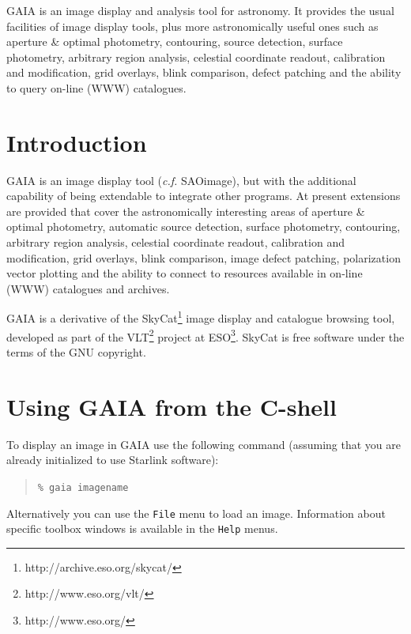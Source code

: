 \documentclass[twoside,11pt]{article}
\newcommand{\stardocinitials}  {SUN}
\newcommand{\stardocnumber}    {214.9}
\newcommand{\stardocabstract} {GAIA is an image display and analysis
tool for astronomy. It provides the usual facilities of image display
tools, plus more astronomically useful ones such as aperture \& optimal
photometry, contouring, source detection, surface photometry,
arbitrary region analysis, celestial coordinate readout, calibration
and modification, grid overlays, blink comparison, defect patching and
the ability to query on-line (WWW) catalogues.}
\newcommand{\stardocname}{\stardocinitials /\stardocnumber}
\newcommand{\htmladdnormallinkfoot}[2]{#1\footnote{#2}}
\newenvironment{latexonly}{}{}
\newcommand{\xref}[3]{#1}
\newcommand{\xlabel}[1]{}
\renewcommand{\_}{\texttt{\symbol{95}}}
\newcommand{\mytt}[1]{{\texttt{#1}}}
\renewcommand{\thepage}{\roman{page}}
\begin{document}
\stardocabstract
  \newpage
  \begin{latexonly}
    \setlength{\parskip}{0mm}
    \tableofcontents
    \setlength{\parskip}{\medskipamount}
    \markboth{\stardocname}{\stardocname}
  \end{latexonly}
\cleardoublepage
\renewcommand{\thepage}{\arabic{page}}
\setcounter{page}{1}


\section{Introduction\xlabel{introduction}\label{introduction}}

GAIA is an image display tool (\textit{c.f.} \xref{SAOimage}{sun166}{}), 
but with the additional capability of being extendable to integrate
other programs.  At present extensions are provided that cover the
astronomically interesting areas of aperture \& optimal photometry,
automatic source detection, surface photometry, contouring, arbitrary
region analysis, celestial coordinate readout, calibration and
modification, grid overlays, blink comparison, image defect patching, 
polarization vector plotting and the ability to connect to resources
available in on-line (WWW) catalogues and archives.

GAIA is a derivative of the
\htmladdnormallinkfoot{SkyCat}{http://archive.eso.org/skycat/} image
display and catalogue browsing tool, developed as part of the
\htmladdnormallinkfoot{VLT}{http://www.eso.org/vlt/} project at
\htmladdnormallinkfoot{ESO}{http://www.eso.org/}. SkyCat is free software
under the terms of the GNU copyright.

\section{\xlabel{using_gaia_from_the_cshell}Using GAIA from the C-shell}

To display an image in GAIA use the following command
(assuming that you are already initialized to use Starlink software):
\begin{quote}
\mytt{\% gaia image\_name}
\end{quote}
Alternatively you can use the \mytt{File} menu to load an image.
Information about specific toolbox windows is available in the
\mytt{Help} menus.
\end{document}
